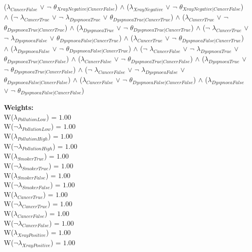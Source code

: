 \documentclass[a4paper,10pt]{report}
\begin{document}
\begin{center}
 ($\lambda_{CancerFalse}$ $\lor$ $\neg$ $\theta_{XrayNegative|CancerFalse}$) $\land$ 
 ($\lambda_{XrayNegative}$ $\lor$ $\neg$ $\theta_{XrayNegative|CancerFalse}$) $\land$ 
 ($\neg$ $\lambda_{CancerTrue}$ $\lor$ $\neg$ $\lambda_{DyspnoeaTrue}$ $\lor$ $\theta_{DyspnoeaTrue|CancerTrue}$) $\land$ 
 ($\lambda_{CancerTrue}$ $\lor$ $\neg$ $\theta_{DyspnoeaTrue|CancerTrue}$) $\land$ 
 ($\lambda_{DyspnoeaTrue}$ $\lor$ $\neg$ $\theta_{DyspnoeaTrue|CancerTrue}$) $\land$ 
 ($\neg$ $\lambda_{CancerTrue}$ $\lor$ $\neg$ $\lambda_{DyspnoeaFalse}$ $\lor$ $\theta_{DyspnoeaFalse|CancerTrue}$) $\land$ 
 ($\lambda_{CancerTrue}$ $\lor$ $\neg$ $\theta_{DyspnoeaFalse|CancerTrue}$) $\land$ 
 ($\lambda_{DyspnoeaFalse}$ $\lor$ $\neg$ $\theta_{DyspnoeaFalse|CancerTrue}$) $\land$ 
 ($\neg$ $\lambda_{CancerFalse}$ $\lor$ $\neg$ $\lambda_{DyspnoeaTrue}$ $\lor$ $\theta_{DyspnoeaTrue|CancerFalse}$) $\land$ 
 ($\lambda_{CancerFalse}$ $\lor$ $\neg$ $\theta_{DyspnoeaTrue|CancerFalse}$) $\land$ 
 ($\lambda_{DyspnoeaTrue}$ $\lor$ $\neg$ $\theta_{DyspnoeaTrue|CancerFalse}$) $\land$ 
 ($\neg$ $\lambda_{CancerFalse}$ $\lor$ $\neg$ $\lambda_{DyspnoeaFalse}$ $\lor$ $\theta_{DyspnoeaFalse|CancerFalse}$) $\land$ 
 ($\lambda_{CancerFalse}$ $\lor$ $\neg$ $\theta_{DyspnoeaFalse|CancerFalse}$) $\land$ 
 ($\lambda_{DyspnoeaFalse}$ $\lor$ $\neg$ $\theta_{DyspnoeaFalse|CancerFalse}$)
 
\end{center}
\textbf{Weights:}\\
W($\lambda_{PollutionLow}$) = $1.00$\\ 
W($\neg \lambda_{PollutionLow}$) = $1.00$\\ 
W($\lambda_{PollutionHigh}$) = $1.00$\\ 
W($\neg \lambda_{PollutionHigh}$) = $1.00$\\ 
W($\lambda_{SmokerTrue}$) = $1.00$\\ 
W($\neg \lambda_{SmokerTrue}$) = $1.00$\\ 
W($\lambda_{SmokerFalse}$) = $1.00$\\ 
W($\neg \lambda_{SmokerFalse}$) = $1.00$\\ 
W($\lambda_{CancerTrue}$) = $1.00$\\ 
W($\neg \lambda_{CancerTrue}$) = $1.00$\\ 
W($\lambda_{CancerFalse}$) = $1.00$\\ 
W($\neg \lambda_{CancerFalse}$) = $1.00$\\ 
W($\lambda_{XrayPositive}$) = $1.00$\\ 
W($\neg \lambda_{XrayPositive}$) = $1.00$\\ 
\end{document}
